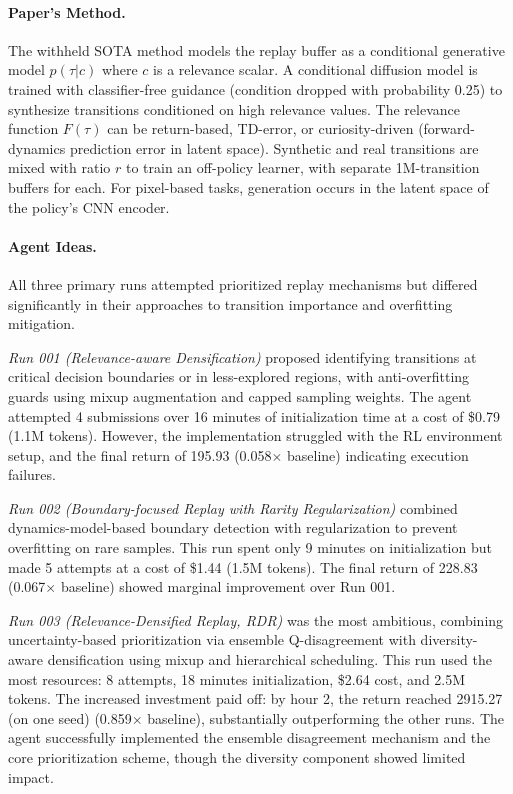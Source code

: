 \documentclass[11pt]{article}
\theoremstyle{plain}
\theoremstyle{definition}
\theoremstyle{remark}
\begin{document}
\paragraph{Paper's Method.}
The withheld SOTA method models the replay buffer as a conditional generative model $p(\tau|c)$ where $c$ is a relevance scalar. A conditional diffusion model is trained with classifier-free guidance (condition dropped with probability 0.25) to synthesize transitions conditioned on high relevance values. The relevance function $F(\tau)$ can be return-based, TD-error, or curiosity-driven (forward-dynamics prediction error in latent space). Synthetic and real transitions are mixed with ratio $r$ to train an off-policy learner, with separate 1M-transition buffers for each. For pixel-based tasks, generation occurs in the latent space of the policy's CNN encoder.

\paragraph{Agent Ideas.}
All three primary runs attempted prioritized replay mechanisms but differed significantly in their approaches to transition importance and overfitting mitigation.

\textit{Run 001 (Relevance-aware Densification)} proposed identifying transitions at critical decision boundaries or in less-explored regions, with anti-overfitting guards using mixup augmentation and capped sampling weights. The agent attempted 4 submissions over 16 minutes of initialization time at a cost of \$0.79 (1.1M tokens). However, the implementation struggled with the RL environment setup, and the final return of 195.93 (0.058$\times$ baseline) indicating execution failures.

\textit{Run 002 (Boundary-focused Replay with Rarity Regularization)} combined dynamics-model-based boundary detection with regularization to prevent overfitting on rare samples. This run spent only 9 minutes on initialization but made 5 attempts at a cost of \$1.44 (1.5M tokens). The final return of 228.83 (0.067$\times$ baseline) showed marginal improvement over Run 001.

\textit{Run 003 (Relevance-Densified Replay, RDR)} was the most ambitious, combining uncertainty-based prioritization via ensemble Q-disagreement with diversity-aware densification using mixup and hierarchical scheduling. This run used the most resources: 8 attempts, 18 minutes initialization, \$2.64 cost, and 2.5M tokens. The increased investment paid off: by hour 2, the return reached 2915.27 (on one seed) (0.859$\times$ baseline), substantially outperforming the other runs. The agent successfully implemented the ensemble disagreement mechanism and the core prioritization scheme, though the diversity component showed limited impact.
\end{document}
